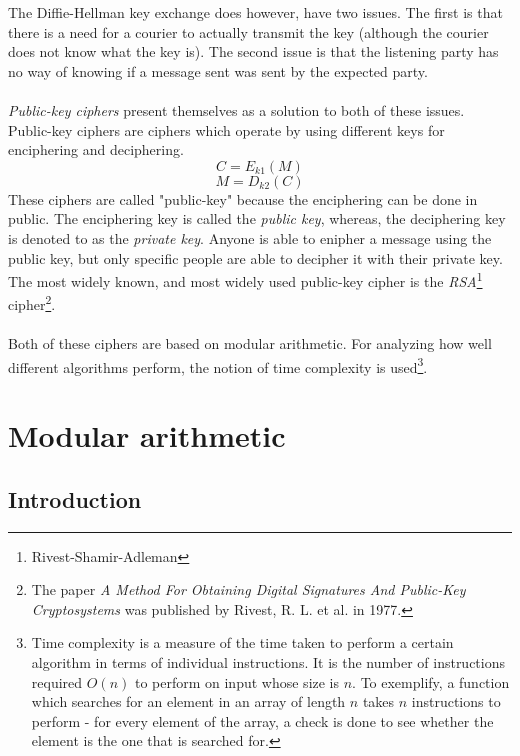\documentclass[a4paper, 12pt]{article}
\begin{document}
The Diffie-Hellman key exchange does however, have two issues. The first is that there is a need for a courier to 
actually transmit the key (although the courier does not know what the key is). The second issue is that the listening 
party has no way of knowing if a message sent was sent by the expected party.

\paragraph*{}
\textit{Public-key ciphers} present themselves as a solution to both of these issues. Public-key ciphers are ciphers 
which operate by using different keys for enciphering and deciphering.
$$C = E_{k1}(M)$$
$$M = D_{k2}(C)$$
These ciphers are called "public-key" because the enciphering can be done in public. The enciphering key is called the 
\textit{public key}, whereas, the deciphering key is denoted to as the \textit{private key}. Anyone is able to enipher 
a message using the public key, but only specific people are able to decipher it with their private key. The most 
widely known, and most widely used public-key cipher is the \textit{RSA}\footnote{Rivest-Shamir-Adleman} 
cipher\footnote{The paper \textit{A Method For Obtaining Digital Signatures And Public-Key Cryptosystems} was published
 by Rivest, R. L. et al. in 1977.}.

\paragraph*{}
Both of these ciphers are based on modular arithmetic. For analyzing how well different algorithms perform, the notion 
of time complexity is used\footnote{Time complexity is a measure of the time taken to perform a certain algorithm in 
terms of individual instructions. It is the number of instructions required $O(n)$ to perform on input whose size is 
$n$. To exemplify, a function which searches for an element in an array of length $n$ takes $n$ instructions to 
perform - for every element of the array, a check is done to see whether the element is the one that is searched for.}.

\section{Modular arithmetic}

\subsection{Introduction}
\end{document}
